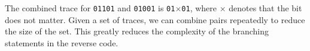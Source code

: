 The combined trace for \texttt{01101} and \texttt{01001} is \texttt{01$\times$01}, where $\times$ denotes that the bit does not matter. 
Given a set of traces, we can combine pairs repeatedly to reduce the size of the set.
This greatly reduces the complexity of the branching statements in the reverse code. 

